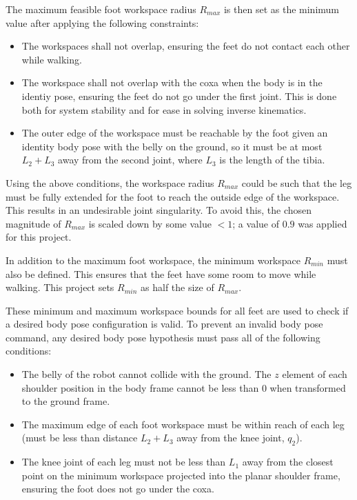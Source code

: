 The maximum feasible foot workspace radius $R_{max}$ is then set as the minimum value after applying the following constraints:

\begin{itemize}
    \item The workspaces shall not overlap, ensuring the feet do not contact each other while walking. 
    \item The workspace shall not overlap with the coxa when the body is in the identiy pose, ensuring the feet do not go under the first joint. This is done both for system stability and for ease in solving inverse kinematics. 
    \item The outer edge of the workspace must be reachable by the foot given an identity body pose with the belly on the ground, so it must be at most $L_2 + L_3$ away from the second joint, where $L_3$ is the length of the tibia. 
\end{itemize}

Using the above conditions, the workspace radius $R_{max}$ could be such that the leg must be fully extended for the foot to reach the outside edge of the workspace. This results in an undesirable joint singularity. To avoid this, the chosen magnitude of $R_{max}$ is scaled down by some value $<1$; a value of $0.9$ was applied for this project.

In addition to the maximum foot workspace, the minimum workspace $R_{min}$ must also be defined. This ensures that the feet have some room to move while walking. This project sets $R_{min}$ as half the size of $R_{max}$. 

These minimum and maximum workspace bounds for all feet are used to check if a desired body pose configuration is valid. To prevent an invalid body pose command, any desired body pose hypothesis must pass all of the following conditions:

\begin{itemize}
    \item The belly of the robot cannot collide with the ground. The $z$ element of each shoulder position in the body frame cannot be less than 0 when transformed to the ground frame. 
    \item The maximum edge of each foot workspace must be within reach of each leg (must be less than distance $L_2 + L_3$ away from the knee joint, $q_2$).
    \item The knee joint of each leg must not be less than $L_1$ away from the closest point on the minimum workspace projected into the planar shoulder frame, ensuring the foot does not go under the coxa.
\end{itemize}

